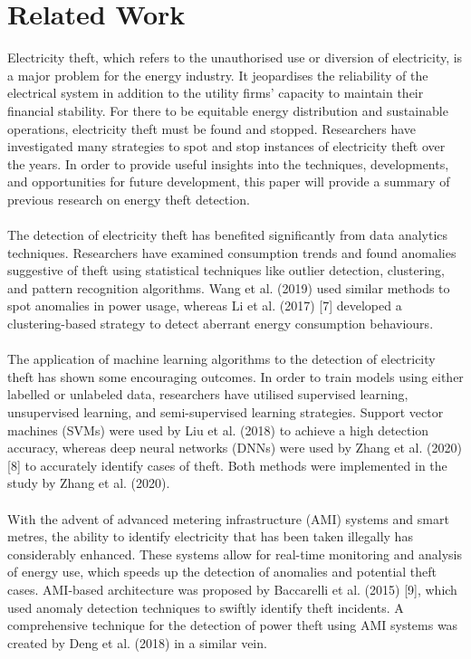 \documentclass{ieeeaccess}
\begin{document}
\section{Related Work}
Electricity theft, which refers to the unauthorised use or diversion of electricity, is a major problem for the energy industry. It jeopardises the reliability of the electrical system in addition to the utility firms' capacity to maintain their financial stability. For there to be equitable energy distribution and sustainable operations, electricity theft must be found and stopped. Researchers have investigated many strategies to spot and stop instances of electricity theft over the years. In order to provide useful insights into the techniques, developments, and opportunities for future development, this paper will provide a summary of previous research on energy theft detection.
\\
\\
The detection of electricity theft has benefited significantly from data analytics techniques. Researchers have examined consumption trends and found anomalies suggestive of theft using statistical techniques like outlier detection, clustering, and pattern recognition algorithms. Wang et al. (2019) used similar methods to spot anomalies in power usage, whereas Li et al. (2017) [7] developed a clustering-based strategy to detect aberrant energy consumption behaviours.
\\
\\
The application of machine learning algorithms to the detection of electricity theft has shown some encouraging outcomes. In order to train models using either labelled or unlabeled data, researchers have utilised supervised learning, unsupervised learning, and semi-supervised learning strategies. Support vector machines (SVMs) were used by Liu et al. (2018) to achieve a high detection accuracy, whereas deep neural networks (DNNs) were used by Zhang et al. (2020) [8] to accurately identify cases of theft. Both methods were implemented in the study by Zhang et al. (2020).
\\
\\
With the advent of advanced metering infrastructure (AMI) systems and smart metres, the ability to identify electricity that has been taken illegally has considerably enhanced. These systems allow for real-time monitoring and analysis of energy use, which speeds up the detection of anomalies and potential theft cases. AMI-based architecture was proposed by Baccarelli et al. (2015) [9], which used anomaly detection techniques to swiftly identify theft incidents. A comprehensive technique for the detection of power theft using AMI systems was created by Deng et al. (2018) in a similar vein.
\end{document}
